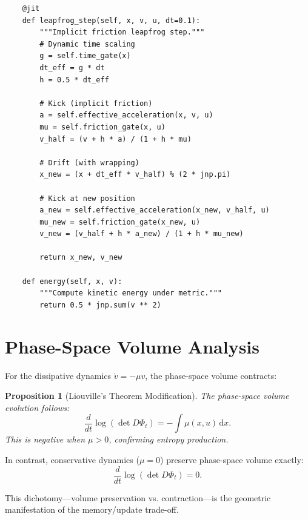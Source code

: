 \documentclass[12pt,letterpaper,twoside]{article}
\newtheorem{prop}{Proposition}[section]
\newcommand{\diff}{\mathrm{d}}
\begin{document}
\begin{verbatim}
    @jit
    def leapfrog_step(self, x, v, u, dt=0.1):
        """Implicit friction leapfrog step."""
        # Dynamic time scaling
        g = self.time_gate(x)
        dt_eff = g * dt
        h = 0.5 * dt_eff
        
        # Kick (implicit friction)
        a = self.effective_acceleration(x, v, u)
        mu = self.friction_gate(x, u)
        v_half = (v + h * a) / (1 + h * mu)
        
        # Drift (with wrapping)
        x_new = (x + dt_eff * v_half) % (2 * jnp.pi)
        
        # Kick at new position
        a_new = self.effective_acceleration(x_new, v_half, u)
        mu_new = self.friction_gate(x_new, u)
        v_new = (v_half + h * a_new) / (1 + h * mu_new)
        
        return x_new, v_new
    
    def energy(self, x, v):
        """Compute kinetic energy under metric."""
        return 0.5 * jnp.sum(v ** 2)
\end{verbatim}

\section{Phase-Space Volume Analysis}

For the dissipative dynamics $\dot{v} = -\mu v$, the phase-space volume contracts:

\begin{prop}[Liouville's Theorem Modification]
The phase-space volume evolution follows:
\[
\frac{d}{dt} \log(\det D\Phi_t) = -\int \mu(x,u) \, \diff x.
\]
This is negative when $\mu > 0$, confirming entropy production.
\end{prop}

In contrast, conservative dynamics ($\mu = 0$) preserve phase-space volume exactly:
\[
\frac{d}{dt} \log(\det D\Phi_t) = 0.
\]

This dichotomy---volume preservation vs. contraction---is the geometric manifestation of the memory/update trade-off.
\end{document}
